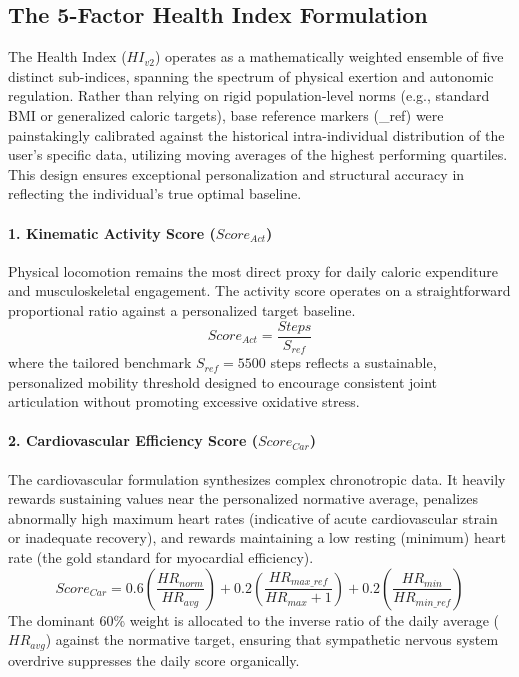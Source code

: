 \documentclass[11pt,a4paper]{article}
\begin{document}
\subsection{The 5-Factor Health Index Formulation}
The Health Index ($HI_{v2}$) operates as a mathematically weighted ensemble of five distinct sub-indices, spanning the spectrum of physical exertion and autonomic regulation. Rather than relying on rigid population-level norms (e.g., standard BMI or generalized caloric targets), base reference markers (\_ref) were painstakingly calibrated against the historical intra-individual distribution of the user's specific data, utilizing moving averages of the highest performing quartiles. This design ensures exceptional personalization and structural accuracy in reflecting the individual’s true optimal baseline.

\paragraph{1. Kinematic Activity Score ($Score_{Act}$)}
Physical locomotion remains the most direct proxy for daily caloric expenditure and musculoskeletal engagement. The activity score operates on a straightforward proportional ratio against a personalized target baseline.
\begin{equation}
Score_{Act} = \frac{Steps}{S_{ref}}
\end{equation}
where the tailored benchmark $S_{ref} = 5500$ steps reflects a sustainable, personalized mobility threshold designed to encourage consistent joint articulation without promoting excessive oxidative stress.

\paragraph{2. Cardiovascular Efficiency Score ($Score_{Car}$)}
The cardiovascular formulation synthesizes complex chronotropic data. It heavily rewards sustaining values near the personalized normative average, penalizes abnormally high maximum heart rates (indicative of acute cardiovascular strain or inadequate recovery), and rewards maintaining a low resting (minimum) heart rate (the gold standard for myocardial efficiency).
\begin{equation}
Score_{Car} = 0.6 \left(\frac{HR_{norm}}{HR_{avg}}\right) + 0.2 \left(\frac{HR_{max\_ref}}{HR_{max} + 1}\right) + 0.2 \left(\frac{HR_{min}}{HR_{min\_ref}}\right)
\end{equation}
The dominant 60\% weight is allocated to the inverse ratio of the daily average ($HR_{avg}$) against the normative target, ensuring that sympathetic nervous system overdrive suppresses the daily score organically.
\end{document}
